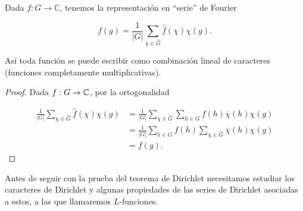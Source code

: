 \begin{theorem}
Dada $f: G \rightarrow \mathbb{C}$, tenemos la representación en ``serie'' de Fourier

$$
f(g)=\frac{1}{|G|}\sum_{\chi \in \widehat{G}}\widehat{f}(\chi) \chi(g).
$$

\end{theorem}

Así toda función se puede escribir  como combinación lineal de caracteres (funciones completamente multiplicativas).\\

\begin{proof}
Dada $f:G\to \mathbb{C}$, por la ortogonalidad

\begin{align*}
    \frac{1}{|G|}\sum_{\chi \in \widehat{G}}\widehat{f}(\chi) \chi(g)&=\frac{1}{|G|}\sum_{\chi \in \widehat{G}}\sum_{h\in G} f(h) \overline{\chi}(h) \chi(g)\\
    &=\frac{1}{|G|}\sum_{h\in G} f(h) \sum_{\chi \in \widehat{G}}\overline{\chi}(h) \chi(g)\\
    &=f(g)
.\end{align*}

\end{proof}

Antes de seguir con la prueba del teorema de Dirichlet necesitamos estudiar los caracteres de Dirichlet y algunas propiedades de las series de Dirichlet asociadas a estos, a las que llamaremos $L$-funciones.
